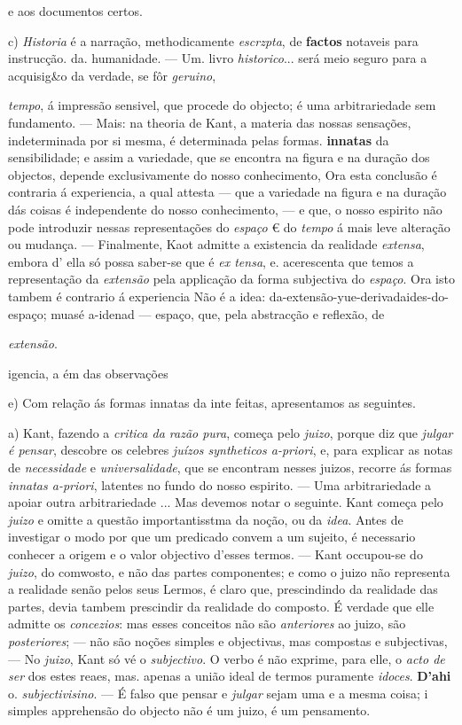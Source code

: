 e aos documentos certos.

c) \emph{Historia} é a narração, methodicamente \emph{escrzpta}, de \textbf{factos} notaveis para instrucção. da. humanidade. --- Um. livro \emph{historico}... será meio seguro para a acquisig\&o da verdade, se fôr \emph{geruino},

\emph{tempo}, á impressão sensivel, que procede do objecto; é uma arbitrariedade sem fundamento. --- Mais: na theoria de Kant, a materia das nossas sensações, indeterminada por si mesma, é determinada pelas formas. \textbf{innatas} da sensibilidade; e assim a variedade, que se encontra na figura e na duração dos objectos, depende exclusivamente do nosso conhecimento, Ora esta conclusão é contraria á experiencia, a qual attesta --- que a variedade na figura e na duração dás coisas é independente do nosso conhecimento, --- e que, o nosso espirito não pode introduzir nessas representações do \emph{espaço} € do \emph{tempo} á mais leve alteração ou mudança. --- Finalmente, Kaot admitte a existencia da realidade \emph{extensa}, embora d' ella só possa saber-se que é \emph{ex tensa}, e. acerescenta que temos a representação da \emph{extensão} pela applicação da forma subjectiva do \emph{espaço}. Ora isto tambem é contrario á experiencia Não é a idea: da-extensão-yue-derivadaides-do- espaço; muasé a-idenad --- espaço, que, pela abstracção e reflexão, de

\textbar{} \emph{extensão}.

igencia, a ém das observações

e) Com relação ás formas innatas da inte feitas, apresentamos as seguintes.

a) Kant, fazendo a \emph{critica da razão pura}, começa pelo \emph{juizo}, porque \textbar{} diz que \emph{julgar é pensar}, descobre os celebres \emph{juízos syntheticos a-priori}, e, para explicar as notas de \emph{necessidade} e \emph{universalidade}, que se encontram nesses juizos, recorre ás formas \emph{innatas a-priori}, latentes no fundo do nosso espirito. --- Uma arbitrariedade a apoiar outra arbitrariedade \textbar{}... Mas devemos notar o seguinte. Kant começa pelo \emph{juizo} e omitte a questão importantisstma da noção, ou da \emph{idea}. Antes de investigar o modo por que um predicado convem a um sujeito, é necessario conhecer a origem e o valor objectivo d'esses termos. --- Kant occupou-se do \emph{juizo}, do comwosto, e não das partes componentes; e como o juizo não representa a realidade senão pelos seus Lermos, é claro que, prescindindo da realidade das partes, devia tambem prescindir da realidade do composto. É verdade que elle admitte os \emph{concezios}: mas esses conceitos não são \emph{anteriores} ao juizo, são \emph{posteriores}; --- não são noções simples e objectivas, mas compostas e subjectivas, --- No \emph{juizo}, Kant só vé o \emph{subjectivo}. O verbo é não exprime, para elle, o \emph{acto de ser} dos estes reaes, mas. apenas a união ideal de termos puramente \emph{idoces}. \textbf{D'ahi} o. \emph{subjectivisino}. --- É falso que pensar e \emph{julgar} sejam uma e a mesma coisa; i simples apprehensão do objecto não é um juizo, é um pensamento.

